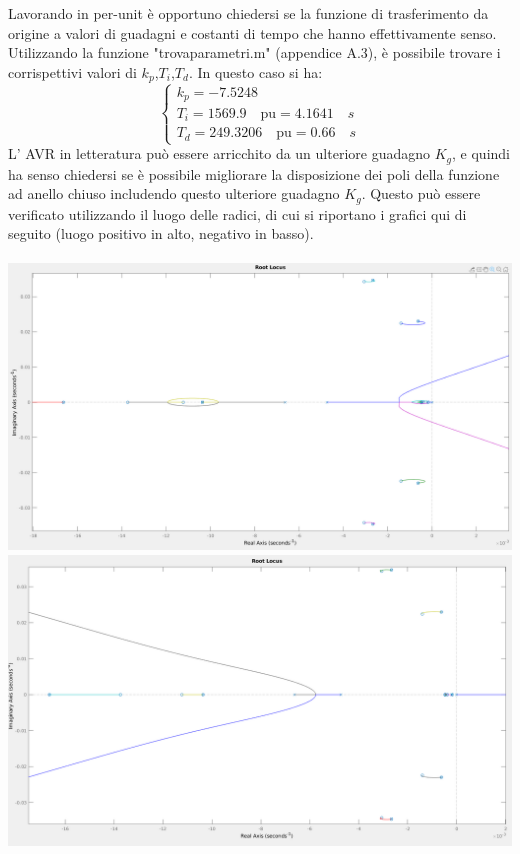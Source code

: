 \documentclass[Lau,noexaminfo]{sapthesis}
\begin{document}
	Lavorando in per-unit è opportuno chiedersi se la funzione di trasferimento da origine a valori di guadagni e costanti di tempo che hanno effettivamente senso. Utilizzando la funzione "trova\textunderscore parametri.m" (appendice A.3), è possibile trovare i corrispettivi valori di $k_p$,$T_i$,$T_d$. In questo caso si ha:\\
	\[
	\begin{cases}
	k_p=-7.5248\\
	T_i=1569.9 \quad\text{pu}=4.1641\quad s\\
	T_d=249.3206\quad \text{pu}=0.66\quad s
	\end{cases}
	\]
	L' AVR in letteratura può essere arricchito da un ulteriore guadagno $K_g$, e quindi ha senso chiedersi se è possibile migliorare la disposizione dei poli della funzione ad anello chiuso includendo questo ulteriore guadagno $K_g$. Questo può essere verificato utilizzando il luogo delle radici, di cui si riportano i grafici qui di seguito (luogo positivo in alto, negativo in basso).\\\\
	\includegraphics[scale=0.27]{rlocus_P2_pos}\\
	\includegraphics[scale=0.27]{rlocus_P2_neg}\\\\
\end{document}
